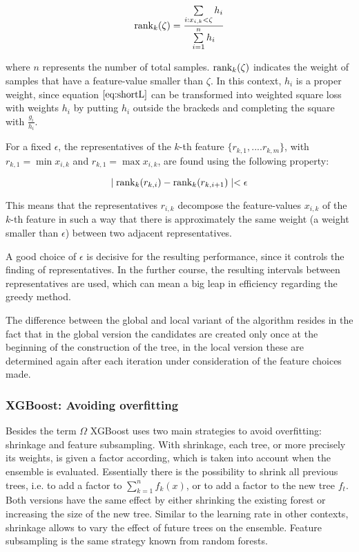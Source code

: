 \begin{equation} \label{eq:ranking}
	\operatorname{rank}_k(\zeta) = \frac{\sum\limits_{i: x_{i,k} < \zeta} h_i}{\sum\limits_{i=1}^n h_i}
\end{equation}

where $n$ represents the number of total samples. $\operatorname{rank}_k(\zeta)$ indicates the weight of samples that have a feature-value smaller than $\zeta$. In this context, $h_i$ is a proper weight, since equation $\ref{eq:shortL}$ can be transformed into weighted square loss with weights $h_i$ by putting $h_i$ outside the brackeds and completing the square with $\frac{g_i}{h_i}$.

For a fixed $\epsilon$, the representatives of the $k$-th feature $\{r_{k,1}, ... .r_{k,m}\}$, with $r_{k,1} = \min x_{i,k}$ and $r_{k,1} = \max x_{i,k}$, are found using the following property:

\begin{equation}
	\mid \operatorname{rank}_k(r_{k,i}) - \operatorname{rank}_k(r_{k,i+1}) \mid < \epsilon
\end{equation}

This means that the representatives $r_{i,k}$ decompose the feature-values $x_{i,k}$ of the $k$-th feature in such a way that there is approximately the same weight (a weight smaller than $\epsilon$) between two adjacent representatives.

A good choice of $\epsilon$ is decisive for the resulting performance, since it controls the finding of representatives. In the further course, the resulting intervals between representatives are used, which can mean a big leap in efficiency regarding the greedy method.

The difference between the global and local variant of the algorithm resides in the fact that in the global version the candidates are created only once at the beginning of the construction of the tree, in the local version these are determined again after each iteration under consideration of the feature choices made.

\subsubsection{XGBoost: Avoiding overfitting}
Besides the term $\Omega$ XGBoost uses two main strategies to avoid overfitting: shrinkage and feature subsampling. With shrinkage, each tree, or more precisely its weights, is given a factor according, which is taken into account when the ensemble is evaluated. Essentially there is the possibility to shrink all previous trees, i.e. to add a factor to $\sum\limits_{k=1}^n f_k(x)$, or to add a factor to the new tree $f_t$. Both versions have the same effect by either shrinking the existing forest or increasing the size of the new tree. Similar to the learning rate in other contexts, shrinkage allows to vary the effect of future trees on the ensemble. Feature subsampling is the same strategy known from random forests.

